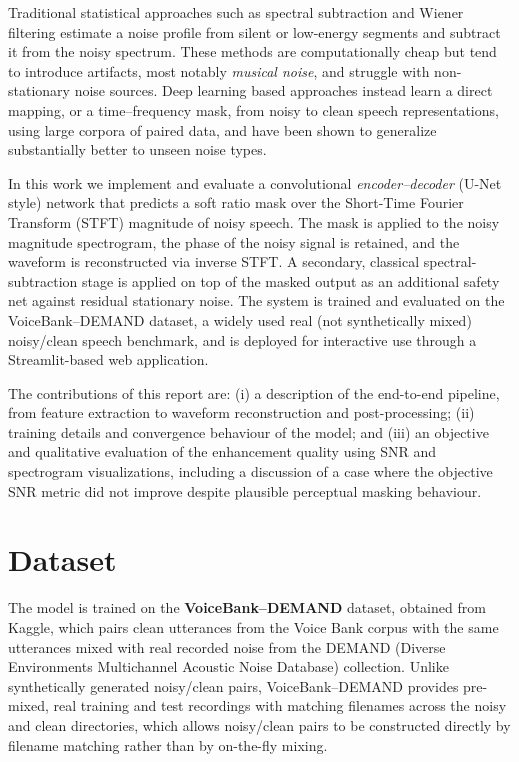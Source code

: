 \documentclass[conference]{IEEEtran}
\begin{document}
Traditional statistical approaches such as spectral subtraction and Wiener filtering estimate a noise profile from silent or low-energy segments and subtract it from the noisy spectrum. These methods are computationally cheap but tend to introduce artifacts, most notably \emph{musical noise}, and struggle with non-stationary noise sources. Deep learning based approaches instead learn a direct mapping, or a time--frequency mask, from noisy to clean speech representations, using large corpora of paired data, and have been shown to generalize substantially better to unseen noise types.

In this work we implement and evaluate a convolutional \emph{encoder--decoder} (U-Net style) network that predicts a soft ratio mask over the Short-Time Fourier Transform (STFT) magnitude of noisy speech. The mask is applied to the noisy magnitude spectrogram, the phase of the noisy signal is retained, and the waveform is reconstructed via inverse STFT. A secondary, classical spectral-subtraction stage is applied on top of the masked output as an additional safety net against residual stationary noise. The system is trained and evaluated on the VoiceBank--DEMAND dataset, a widely used real (not synthetically mixed) noisy/clean speech benchmark, and is deployed for interactive use through a Streamlit-based web application.

The contributions of this report are: (i) a description of the end-to-end pipeline, from feature extraction to waveform reconstruction and post-processing; (ii) training details and convergence behaviour of the model; and (iii) an objective and qualitative evaluation of the enhancement quality using SNR and spectrogram visualizations, including a discussion of a case where the objective SNR metric did not improve despite plausible perceptual masking behaviour.

\section{Dataset}
The model is trained on the \textbf{VoiceBank--DEMAND} dataset, obtained from Kaggle, which pairs clean utterances from the Voice Bank corpus with the same utterances mixed with real recorded noise from the DEMAND (Diverse Environments Multichannel Acoustic Noise Database) collection. Unlike synthetically generated noisy/clean pairs, VoiceBank--DEMAND provides pre-mixed, real training and test recordings with matching filenames across the noisy and clean directories, which allows noisy/clean pairs to be constructed directly by filename matching rather than by on-the-fly mixing.
\end{document}
